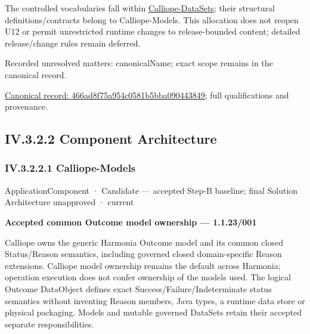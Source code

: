 The controlled vocabularies fall within \hyperref[element:466ad8f75a954c0581b5bba090443849]{Calliope-DataSets};
their structural definitions/contracts belong to Calliope-Models. This allocation
does not reopen U12 or permit unrestricted runtime changes to release-bounded
content; detailed release/change rules remain deferred.


{\small Recorded unresolved matters: canonicalName; exact scope remains in the canonical record.}\par
{\footnotesize \href{../../../../../../../continuum/application/application-component/466ad8f75a954c0581b5bba090443849.md}{Canonical record: 466ad8f75a954c0581b5bba090443849}; full qualifications and provenance.}\par
\subsection*{IV.3.2.2 Component Architecture}
\label{navigation:IV.3.2.2}

\subsubsection*{IV.3.2.2.1 Calliope-Models}
\label{navigation:IV.3.2.2.1}

\label{element:307b3440a507403f8bc214d290bffb6a}
{\small ApplicationComponent · Candidate — accepted Step-B baseline; final Solution Architecture unapproved · current}\par

\par\medskip\textbf{Accepted common Outcome model ownership — 1.1.23/001}\par


Calliope owns the generic Harmonia Outcome model and its common closed Status/Reason semantics, including governed closed domain-specific Reason extensions. Calliope model ownership remains the default across Harmonia; operation execution does not confer ownership of the models used. The logical Outcome DataObject defines exact Success/Failure/Indeterminate status semantics without inventing Reason members, Java types, a runtime data store or physical packaging. Models and mutable governed DataSets retain their accepted separate responsibilities.



